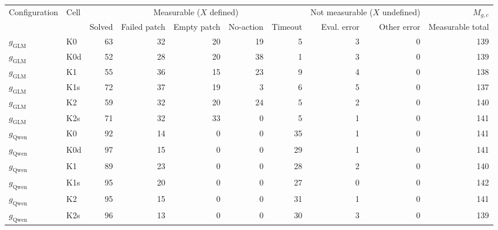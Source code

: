 \begin{tabular}{@{}llrrrrrrrr@{}}
  \toprule
  Configuration & Cell & \multicolumn{5}{c}{Measurable ($X$ defined)} & \multicolumn{2}{c}{Not measurable ($X$ undefined)} & $M_{g,c}$ \\
  \cmidrule(lr){3-7}\cmidrule(lr){8-9}
  & & Solved & Failed patch & Empty patch & No-action & Timeout & Eval. error & Other error & Measurable total \\
  \midrule
  $g_{\mathrm{GLM}}$ & K0 & 63 & 32 & 20 & 19 & 5 & 3 & 0 & 139 \\
  \rowcolor{black!6} $g_{\mathrm{GLM}}$ & K0d & 52 & 28 & 20 & 38 & 1 & 3 & 0 & 139 \\
  $g_{\mathrm{GLM}}$ & K1 & 55 & 36 & 15 & 23 & 9 & 4 & 0 & 138 \\
  \rowcolor{black!6} $g_{\mathrm{GLM}}$ & K1s & 72 & 37 & 19 & 3 & 6 & 5 & 0 & 137 \\
  $g_{\mathrm{GLM}}$ & K2 & 59 & 32 & 20 & 24 & 5 & 2 & 0 & 140 \\
  \rowcolor{black!6} $g_{\mathrm{GLM}}$ & K2s & 71 & 32 & 33 & 0 & 5 & 1 & 0 & 141 \\
  \addlinespace[2pt]
  $g_{\mathrm{Qwen}}$ & K0 & 92 & 14 & 0 & 0 & 35 & 1 & 0 & 141 \\
  \rowcolor{black!6} $g_{\mathrm{Qwen}}$ & K0d & 97 & 15 & 0 & 0 & 29 & 1 & 0 & 141 \\
  $g_{\mathrm{Qwen}}$ & K1 & 89 & 23 & 0 & 0 & 28 & 2 & 0 & 140 \\
  \rowcolor{black!6} $g_{\mathrm{Qwen}}$ & K1s & 95 & 20 & 0 & 0 & 27 & 0 & 0 & 142 \\
  $g_{\mathrm{Qwen}}$ & K2 & 95 & 15 & 0 & 0 & 31 & 1 & 0 & 141 \\
  \rowcolor{black!6} $g_{\mathrm{Qwen}}$ & K2s & 96 & 13 & 0 & 0 & 30 & 3 & 0 & 139 \\
  \bottomrule
\end{tabular}
